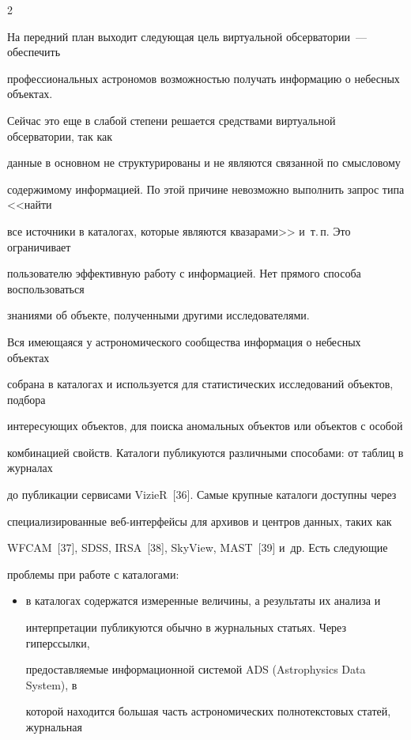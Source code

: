 \begin{multicols}{2}
\vspace*{-1pt}



      На передний план выходит следующая цель виртуальной обсерватории~--- обеспечить 

профессиональных астрономов возможностью получать информацию о небесных объектах. 

Сейчас это еще в слабой степени решается средствами виртуальной обсерватории, так как 

данные в основном не структурированы и не являются связанной по смысловому 

содержимому информацией. По этой причине невозможно выполнить запрос типа <<найти 

все источники в каталогах, которые являются квазарами>> и~т.\,п. Это ограничивает 

пользователю эффективную работу с информацией. Нет прямого способа воспользоваться 

знаниями об объекте, полученными другими исследователями. 

      

      Вся имеющаяся у астрономического сообщества информация о небесных объектах 

собрана в каталогах и используется для статистических исследований объектов, подбора 

интересующих объектов, для поиска аномальных объектов или объектов с особой 

комбинацией свойств. Каталоги публикуются различными способами: от таблиц в журналах 

до публикации сервисами VizieR~[36]. Самые крупные каталоги доступны через 

специализированные веб-ин\-тер\-фей\-сы для архивов и центров данных, таких как 

WFCAM~[37], SDSS, IRSA~[38], SkyView, MAST~[39] и~др. Есть следующие 

проблемы при работе с каталогами: 

      \begin{itemize} %

  \item в каталогах содержатся измеренные величины, а результаты их анализа и 

интерпретации пуб\-ли\-ку\-ют\-ся обычно в журнальных статьях. Через гиперссылки, 

предоставляемые информационной системой ADS ({Astrophysics Data System}), в 

которой находится большая часть астрономических полнотекстовых статей, журнальная 


\end{itemize}
\end{multicols}
